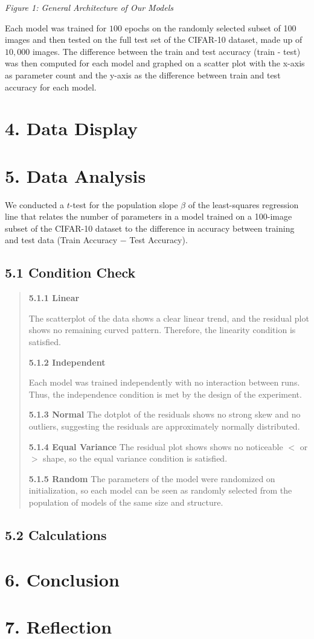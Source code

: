 \documentclass[12pt]{article}
\begin{document}
    \centerline{\textit{Figure 1: General Architecture of Our Models}}

    Each model was trained for $100$ epochs on the randomly selected subset of 100 images and then tested
    on the full test set of the CIFAR-10 dataset, made up of $10,000$ images. The difference between the train and test accuracy (train - test) was then
    computed for each model and graphed on a scatter plot with the x-axis
    as parameter count and the y-axis as the difference between train and test accuracy for each model.

    \section*{4. Data Display}

    \section*{5. Data Analysis}

    We conducted a $t$-test for the population slope $\beta$ of the least-squares regression line that relates the number of parameters in a model trained on a 100-image subset of the CIFAR-10 dataset to the difference in accuracy between training and test data (Train Accuracy $-$ Test Accuracy).

    \subsection*{5.1 Condition Check}

    \begin{quote}

    \textbf{5.1.1 Linear}

    {The scatterplot of the data shows a clear linear trend, and the residual plot shows no remaining curved pattern. Therefore, the linearity condition is satisfied.}

    \textbf{5.1.2 Independent}

    Each model was trained independently with no interaction between runs. Thus, the independence condition is met by the design of the experiment.

    \textbf{5.1.3 Normal}
    The dotplot of the residuals shows no strong skew and no outliers, suggesting the residuals are approximately normally distributed.

    \textbf{5.1.4 Equal Variance}
    The residual plot shows shows no noticeable $<$ or $>$ shape, so the equal variance condition is satisfied.

    \textbf{5.1.5 Random}
    The parameters of the model were randomized on initialization, so each model can be seen as randomly selected from the population
    of models of the same size and structure.

    \end{quote}

    \subsection*{5.2 Calculations}

    \section*{6. Conclusion}

    \section*{7. Reflection}
\end{document}

